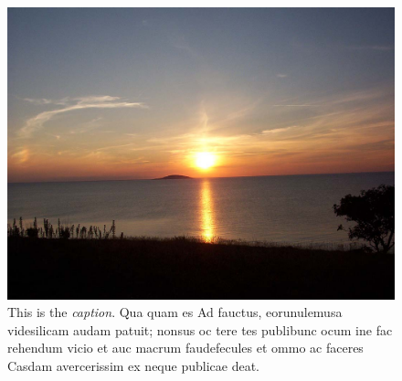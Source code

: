     \begin{figure}[t]
    \includegraphics{Example/Sunset}
	\caption{This is the \emph{caption}. Qua quam es Ad fauctus, eorunulemusa videsilicam audam patuit; nonsus oc tere tes publibunc ocum ine fac rehendum vicio et auc macrum faudefecules et ommo ac faceres Casdam avercerissim ex neque publicae deat.} 
    \end{figure}

